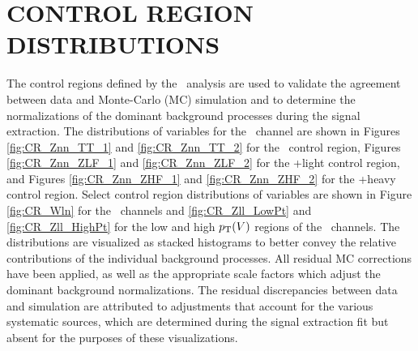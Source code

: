 \chapter{CONTROL REGION DISTRIBUTIONS}
\label{appendixB}

The control regions defined by the \VHbb\ analysis are used to validate the agreement between data and Monte-Carlo (MC) simulation and to determine the normalizations of the dominant background processes during the signal extraction. The distributions of variables for the \ZnnH\ channel are shown in Figures \ref{fig:CR_Znn_TT_1} and \ref{fig:CR_Znn_TT_2} for the \qrkt\qrktbar\ control region, Figures \ref{fig:CR_Znn_ZLF_1} and \ref{fig:CR_Znn_ZLF_2} for the \bosZ+light control region, and Figures \ref{fig:CR_Znn_ZHF_1} and \ref{fig:CR_Znn_ZHF_2} for the \bosZ+heavy control region. Select control region distributions of variables are shown in Figure \ref{fig:CR_Wln} for the \WlnH\ channels and \ref{fig:CR_Zll_LowPt} and \ref{fig:CR_Zll_HighPt} for the low and high $p_{\mathrm{T}}(V)$ regions of the \ZllH\ channels. The distributions are visualized as stacked histograms to better convey the relative contributions of the individual background processes. All residual MC corrections have been applied, as well as the appropriate scale factors which adjust the dominant background normalizations. The residual discrepancies between data and simulation are attributed to adjustments that account for the various systematic sources, which are determined during the signal extraction fit but absent for the purposes of these visualizations.



